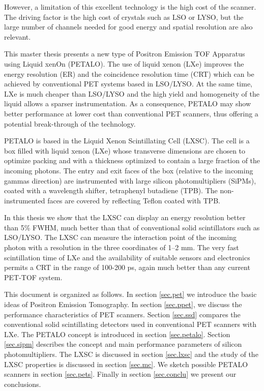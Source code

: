 \documentclass[12pt,a4paper,english,twoside]{article}
\begin{document}
However, a limitation of this excellent technology is the high cost of the scanner. The driving factor is the high cost of crystals such as LSO or LYSO, but the large number of channels needed for good energy and spatial resolution are also relevant. 

This master thesis presents a new type of Positron Emission TOF Apparatus using Liquid xenOn (PETALO). The use of liquid xenon (LXe) improves the energy resolution (ER) and the coincidence resolution time (CRT) which can be achieved by conventional PET systems based in LSO/LYSO. At the same time, LXe is much cheaper than LSO/LYSO and the high yield and homogeneity of the liquid allows a sparser instrumentation. As a consequence, PETALO may show better performance at lower cost than conventional PET scanners, thus offering a potential break-through of the technology.  

PETALO is based in the  Liquid Xenon Scintillating Cell (LXSC).  The cell is a box filled with liquid xenon (LXe) whose transverse dimensions are chosen to optimize packing and with a thickness optimized to contain a large fraction of the incoming photons. The entry and exit faces of the box (relative to the incoming gammas direction) are instrumented with large silicon photomultipliers (SiPMs), coated with a wavelength shifter, tetraphenyl butadiene (TPB). The non-instrumented faces are covered by reflecting Teflon coated with TPB. 

In this thesis we show that the LXSC can display an energy resolution better than 5\% FWHM, much better than that of conventional solid scintillators such as LSO/LYSO. The LXSC can measure the interaction point of the incoming photon with a resolution in the three coordinates of 1--2 mm. The very fast scintillation time of LXe  and the availability of suitable sensors and electronics permits a CRT in the range of 100-200 ps, again much better than any current PET-TOF system. 

This document is organized as follows. In section \ref{sec.pet} we introduce the basic ideas of Positron Emission Tomography. In section \ref{sec.ppet}, we discuss the performance characteristics of PET scanners. Section \ref{sec.ssd} compares the conventional solid scintillating detectors used in conventional PET scanners with LXe. The PETALO concept is introduced in section \ref{sec.petalo}. Section \ref{sec.sipm} describes the concept and main performance parameters of silicon photomultipliers. The LXSC is discussed in section \ref{sec.lxsc} and the study of the LXSC properties is discussed in section \ref{sec.mc}. 
We sketch possible PETALO scanners in section \ref{sec.pets}. Finally in section \ref{sec.conclu} we present our conclusions. 
\end{document}
